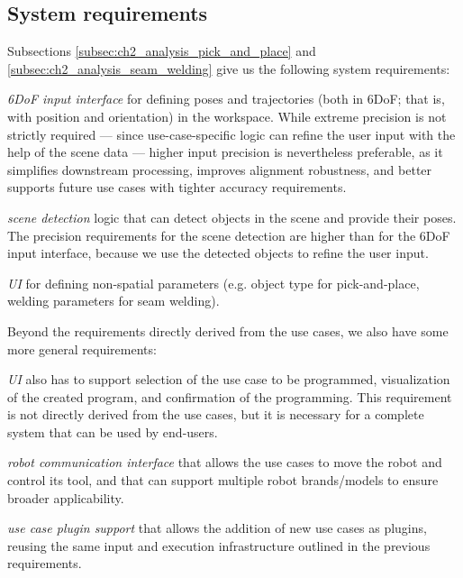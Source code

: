 \subsection{System requirements} \label{subsec:ch2_analysis_system_requirements}

Subsections \ref{subsec:ch2_analysis_pick_and_place} and \ref{subsec:ch2_analysis_seam_welding} give us the following system requirements:
\begin{requirements}
    \item \emph{6DoF input interface} for defining poses and trajectories (both in 6DoF; that is, with position and orientation) in the workspace. While extreme precision is not strictly required --- since use-case-specific logic can refine the user input with the help of the scene data --- higher input precision is nevertheless preferable, as it simplifies downstream processing, improves alignment robustness, and better supports future use cases with tighter accuracy requirements. \label{req:6DoF_input_interface}
    \item \emph{scene detection} logic that can detect objects in the scene and provide their poses. The precision requirements for the scene detection are higher than for the 6DoF input interface, because we use the detected objects to refine the user input. \label{req:scene_detection_logic}
    \item \emph{UI} for defining non-spatial parameters (e.g. object type for pick-and-place, welding parameters for seam welding). \label{req:ui}
\end{requirements}

Beyond the requirements directly derived from the use cases, we also have some more general requirements:
\begin{requirements}[resume]
    \item \emph{UI} also has to support selection of the use case to be programmed, visualization of the created program, and confirmation of the programming. This requirement is not directly derived from the use cases, but it is necessary for a complete system that can be used by end-users. \label{req:ui_use_case_selection}
    \item \emph{robot communication interface} that allows the use cases to move the robot and control its tool, and that can support multiple robot brands/models to ensure broader applicability. \label{req:robot_communication_interface}
    \item \emph{use case plugin support} that allows the addition of new use cases as plugins, reusing the same input and execution infrastructure outlined in the previous requirements. \label{req:use_case_plugin_support}
\end{requirements}


